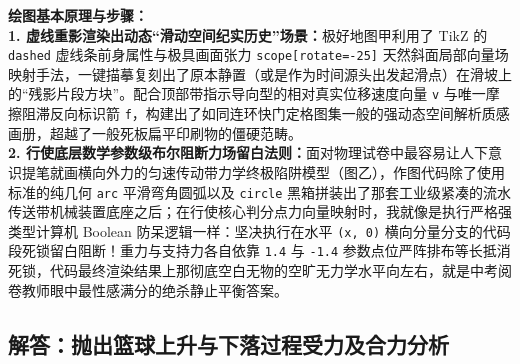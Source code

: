 \vspace{0.6cm}

{\small\color{blue!70!black}
\textbf{绘图基本原理与步骤：}\\
\textbf{1. 虚线重影渲染出动态“滑动空间纪实历史”场景：}极好地图甲利用了 TikZ 的 \texttt{dashed} 虚线条前身属性与极具画面张力 \texttt{scope[rotate=-25]} 天然斜面局部向量场映射手法，一键描摹复刻出了原本静置（或是作为时间源头出发起滑点）在滑坡上的“残影片段方块”。配合顶部带指示导向型的相对真实位移速度向量 \texttt{v} 与唯一摩擦阻滞反向标识箭 \texttt{f}，构建出了如同连环快门定格图集一般的强动态空间解析质感画册，超越了一般死板扁平印刷物的僵硬范畴。\\
\textbf{2. 行使底层数学参数级布尔阻断力场留白法则：}面对物理试卷中最容易让人下意识提笔就画横向外力的匀速传动带力学终极陷阱模型（图乙），作图代码除了使用标准的纯几何 \texttt{arc} 平滑弯角圆弧以及 \texttt{circle} 黑箱拼装出了那套工业级紧凑的流水传送带机械装置底座之后；在行使核心判分点力向量映射时，我就像是执行严格强类型计算机 Boolean 防呆逻辑一样：坚决执行在水平 \texttt{(x, 0)} 横向分量分支的代码段死锁留白阻断！重力与支持力各自依靠 \texttt{1.4} 与 \texttt{-1.4} 参数点位严阵排布等长抵消死锁，代码最终渲染结果上那彻底空白无物的空旷无力学水平向左右，就是中考阅卷教师眼中最性感满分的绝杀静止平衡答案。
}


\newpage

\subsection{解答：抛出篮球上升与下落过程受力及合力分析}

\vspace{0.6cm}

